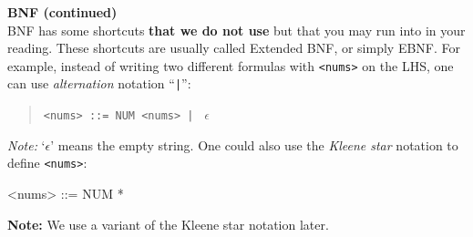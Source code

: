 \begin{minipage}[t]{\sw}
\slidenumber
\LARGE
{\bf BNF (continued)}\\[2ex]
\emm{\Large\LightBox{\MYlon}}\exx
BNF has some shortcuts {\bf that we do not use}
but that you may run into in your reading.
These shortcuts are usually called Extended BNF, or simply EBNF.
For example, instead of writing two different formulas
with \verb'<nums>' on the LHS,
one can use {\em alternation} notation ``\verb'|''':
\begin{quote}
\verb'<nums> ::= NUM <nums> | ' $\epsilon$
\end{quote}
{\em Note:} `$\epsilon$' means the empty string.\exx
One could also use the {\em Kleene star} notation
to define \verb'<nums>':
\begin{qv}
<nums> ::= { NUM }*
\end{qv}
{\bf Note:} We use a variant of the Kleene star notation later.
\end{minipage}
\clearpage
